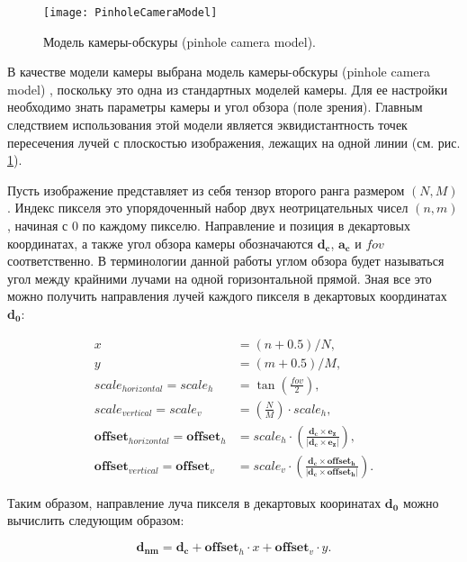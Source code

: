 \begin{figure}[h]
    \centering
    \texttt{[image: PinholeCameraModel]}
    \caption{Модель камеры-обскуры (pinhole camera model).}
    \label{fig:pinhole_camera}
\end{figure}

В качестве модели камеры выбрана модель камеры-обскуры \linebreak(pinhole camera model) \cite[стр.~47]{marrs2021ray}, поскольку это одна из стандартных моделей камеры. Для ее настройки необходимо знать параметры камеры и угол обзора (поле зрения). Главным следствием использования этой модели является эквидистантность точек пересечения лучей с плоскостью изображения, лежащих на одной линии (см. рис. \ref{fig:pinhole_camera}).

Пусть изображение представляет из себя тензор второго ранга размером $(N, M)$. Индекс пикселя это упорядоченный набор двух неотрицательных чисел $(n, m)$, начиная с $0$ по каждому пикселю. Направление и позиция в декартовых координатах, а также угол обзора камеры обозначаются $\mathbf{d_c}$, $\mathbf{a_c}$ и $fov$ соответственно. В терминологии данной работы углом обзора будет называться угол между крайними лучами на одной горизонтальной прямой. Зная все это можно получить направления лучей каждого пикселя в декартовых координатах $\mathbf{d_0}$:

\begin{align*}
    x &= (n + 0.5)/N, \\
    y &= (m + 0.5)/M, \\
    scale_{horizontal} = scale_h &= \tan{\left(\frac{fov}{2}\right)}, \\
    scale_{vertical} = scale_v &= \left(\frac{N}{M}\right) \cdot scale_h, \\
    \mathbf{offset}_{horizontal} = \mathbf{offset}_h &= scale_h \cdot \left(\frac{\mathbf{d_c} \times \mathbf{e_z}}{\left|\mathbf{d_c} \times \mathbf{e_z}\right|}\right), \\
    \mathbf{offset}_{vertical} = \mathbf{offset}_v &= scale_v \cdot \left(\frac{\mathbf{d_c} \times \mathbf{offset_h}}{\left|\mathbf{d_c} \times \mathbf{offset_h}\right|}\right).
\end{align*}

Таким образом, направление луча пикселя в декартовых кооринатах $\mathbf{d_0}$ можно вычислить следующим образом:

\begin{equation}
\label{eq:init_rays}
    \mathbf{d_{nm}} = \mathbf{d_c} + \mathbf{offset}_{h} \cdot x + \mathbf{offset}_{v} \cdot y.
\end{equation}

